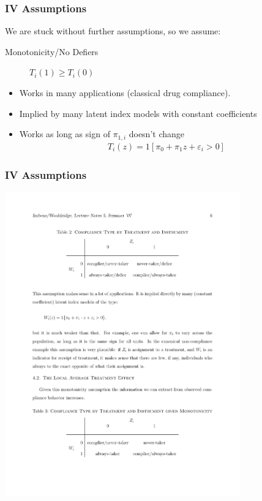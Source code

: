 \documentclass[xcolor=pdftex,dvipsnames,table,mathserif,aspectratio=169]{beamer}
\begin{document}
\begin{frame}
\frametitle{IV Assumptions}
We are stuck without further assumptions, so we assume:
\begin{description}
\item [Monotonicity/No Defiers] $T_i(1) \geq T_i(0)$
\end{description}
\begin{itemize}
\item Works in many applications (classical drug compliance).
\item Implied by many latent index models with constant coefficients
\item Works as long as sign of $\pi_{1,i}$ doesn't change
\begin{eqnarray*}
T_i(z)  = 1 [\pi_0 + \pi_1 z + \varepsilon_i > 0]
\end{eqnarray*}
\end{itemize}
\end{frame}


\begin{frame}
\frametitle{IV Assumptions}
\includegraphics[width=4in]{./resources/imbens2.pdf}
\end{frame}
\end{document}
